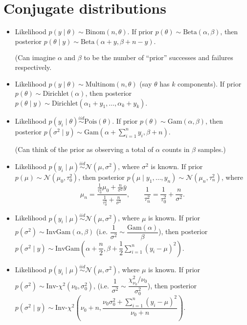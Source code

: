 \documentclass[twoside]{article}
\newcommand{\dis}{\displaystyle}
\newcommand\calN{\mathcal{N}}
\newcommand\sg{\sigma}
\def\t{\theta}
\begin{document}
\section{Conjugate distributions}
\begin{itemize}
\item Likelihood $p(y \mid \t) \sim \text{Binom}(n, \t)$. If prior $p(\t) \sim \text{Beta}(\alpha, \beta)$, then posterior $p(\t \mid y) \sim \text{Beta}(\alpha + y, \beta + n - y)$.

(Can imagine $\alpha$ and $\beta$ to be the number of ``prior'' successes and failures respectively.

\item Likelihood $p(y \mid \t) \sim \text{Multinom}(n, \t)$ (say $\t$ has $k$ components). If prior $p(\t) \sim \text{Dirichlet}(\alpha)$, then posterior $p(\t \mid y) \sim \text{Dirichlet}(\alpha_1 + y_1, \dots, \alpha_k + y_k)$.

\item Likelihood $p(y_i \mid \t) \stackrel{iid}{\sim}\text{Pois}(\t)$. If prior $p(\t) \sim \text{Gam}(\alpha, \beta)$, then posterior $p(\sg^2 \mid y) \sim \text{Gam}\left(\alpha + \sum_{i=1}^n y_i, \beta + n \right)$.

(Can think of the prior as observing a total of $\alpha$ counts in $\beta$ samples.)

\item Likelihood $p(y_i \mid \mu) \stackrel{iid}{\sim} \calN(\mu, \sg^2)$, where $\sg^2$ is known. If prior $p(\mu) \sim \calN(\mu_0, \tau_0^2)$, then posterior $p(\mu \mid y_1, \dots, y_n) \sim \calN(\mu_n, \tau_n^2)$, where
\[ \mu_n = \frac{\frac{1}{\tau_0^2}\mu_0 + \frac{n}{\sg^2}\bar{y}}{\frac{1}{\tau_0^2} + \frac{n}{\sg^2}}, \qquad \frac{1}{\tau_n^2} = \frac{1}{\tau_0^2} + \frac{n}{\sg^2}. \]

\item Likelihood $p(y_i \mid \mu) \stackrel{iid}{\sim} \calN(\mu, \sg^2)$, where $\mu$ is known. If prior $p(\sg^2) \sim \text{InvGam}(\alpha, \beta)$ (i.e. $\dfrac{1}{\sg^2} \sim \dfrac{\text{Gam}(\alpha)}{\beta}$), then posterior $p(\sg^2 \mid y) \sim \text{InvGam}\left(\alpha + \dfrac{n}{2}, \beta + \dfrac{1}{2}\dis\sum_{i=1}^n (y_i - \mu)^2 \right)$.

\item Likelihood $p(y_i \mid \mu) \stackrel{iid}{\sim} \calN(\mu, \sg^2)$, where $\mu$ is known. If prior $p(\sg^2) \sim \text{Inv-}\chi^2(\nu_0, \sg_0^2)$, (i.e. $\dfrac{1}{\sg^2} \sim \dfrac{\chi_{\nu_0}^2 / \nu_0}{\sg_0^2}$), then posterior $p(\sg^2 \mid y) \sim \text{Inv-}\chi^2\left(\nu_0 + n, \dfrac{\nu_0 \sg_0^2 + \sum_{i=1}^n (y_i - \mu)^2}{\nu_0 + n} \right)$.


\end{itemize}
\end{document}
